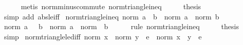 \begin{isabellebody}
\ \ \ \ \isamarkupfalse%
\ {\isacharparenleft}{\kern0pt}metis\ norm{\isacharunderscore}{\kern0pt}minus{\isacharunderscore}{\kern0pt}commute\ norm{\isacharunderscore}{\kern0pt}triangle{\isacharunderscore}{\kern0pt}ineq{}{\isacharparenright}{\kern0pt}\isanewline
\ \ \isamarkupfalse%
\ \isamarkupfalse%
\ {\isacharquery}{\kern0pt}thesis\isanewline
\ \ \ \ \isamarkupfalse%
\ {\isacharparenleft}{\kern0pt}simp\ add{\isacharcolon}{\kern0pt}\ abs{\isacharunderscore}{\kern0pt}le{\isacharunderscore}{\kern0pt}iff{\isacharparenright}{\kern0pt}\isanewline
{}\isamarkupfalse%
%
\endisatagproof
{\isafoldproof}%
%
\isadelimproof
\isanewline
%
\endisadelimproof
\isanewline
{}\isamarkupfalse%
\ norm{\isacharunderscore}{\kern0pt}triangle{\isacharunderscore}{\kern0pt}ineq{}{\isacharcolon}{\kern0pt}\ {\isachardoublequoteopen}norm\ {\isacharparenleft}{\kern0pt}a\ {\isacharminus}{\kern0pt}\ b{\isacharparenright}{\kern0pt}\ {\isasymle}\ norm\ a\ {\isacharplus}{\kern0pt}\ norm\ b{\isachardoublequoteclose}\isanewline
%
\isadelimproof
%
\endisadelimproof
%
\isatagproof
{}\isamarkupfalse%
\ {\isacharminus}{\kern0pt}\isanewline
\ \ \isamarkupfalse%
\ {\isachardoublequoteopen}norm\ {\isacharparenleft}{\kern0pt}a\ {\isacharplus}{\kern0pt}\ {\isacharminus}{\kern0pt}\ b{\isacharparenright}{\kern0pt}\ {\isasymle}\ norm\ a\ {\isacharplus}{\kern0pt}\ norm\ {\isacharparenleft}{\kern0pt}{\isacharminus}{\kern0pt}\ b{\isacharparenright}{\kern0pt}{\isachardoublequoteclose}\isanewline
\ \ \ \ \isamarkupfalse%
\ {\isacharparenleft}{\kern0pt}rule\ norm{\isacharunderscore}{\kern0pt}triangle{\isacharunderscore}{\kern0pt}ineq{\isacharparenright}{\kern0pt}\isanewline
\ \ \isamarkupfalse%
\ \isamarkupfalse%
\ {\isacharquery}{\kern0pt}thesis\ \isamarkupfalse%
\ simp\isanewline
{}\isamarkupfalse%
%
\endisatagproof
{\isafoldproof}%
%
\isadelimproof
\isanewline
%
\endisadelimproof
\isanewline
{}\isamarkupfalse%
\ norm{\isacharunderscore}{\kern0pt}triangle{\isacharunderscore}{\kern0pt}le{\isacharunderscore}{\kern0pt}diff{\isacharcolon}{\kern0pt}\ {\isachardoublequoteopen}norm\ x\ {\isacharplus}{\kern0pt}\ norm\ y\ {\isasymle}\ e\ {\isasymLongrightarrow}\ norm\ {\isacharparenleft}{\kern0pt}x\ {\isacharminus}{\kern0pt}\ y{\isacharparenright}{\kern0pt}\ {\isasymle}\ e{\isachardoublequoteclose}\isanewline
%
\isadelimproof
\ \ \ \ %
\endisadelimproof
%
\isatagproof
{}\isamarkupfalse%

\end{isabellebody}
